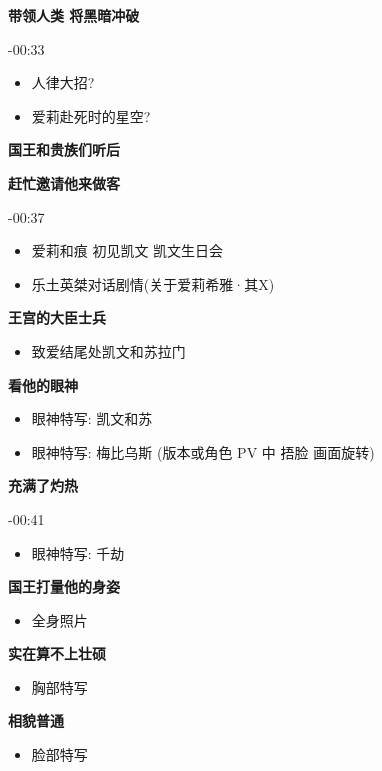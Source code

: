 \documentclass[a4paper]{article}
\begin{document}
\textbf{带领人类 将黑暗冲破}

-00:33

\begin{itemize}
    \item 人律大招?
    \item 爱莉赴死时的星空?
\end{itemize}

\textbf{国王和贵族们听后}

\textbf{赶忙邀请他来做客}

-00:37

\begin{itemize}
    \item 爱莉和痕 初见凯文 凯文生日会
    \item 乐土英桀对话剧情(关于爱莉希雅·其X)
\end{itemize}

\textbf{王宫的大臣士兵}

\begin{itemize}
    \item 致爱结尾处凯文和苏拉门
\end{itemize}

\textbf{看他的眼神}

\begin{itemize}
    \item 眼神特写: 凯文和苏
    \item 眼神特写: 梅比乌斯 (版本或角色 PV 中 捂脸 画面旋转)
\end{itemize}

\textbf{充满了灼热}

-00:41

\begin{itemize}
    \item 眼神特写: 千劫
\end{itemize}

\textbf{国王打量他的身姿}

\begin{itemize}
    \item 全身照片
\end{itemize}

\textbf{实在算不上壮硕}

\begin{itemize}
    \item 胸部特写
\end{itemize}

\textbf{相貌普通}

\begin{itemize}
    \item 脸部特写
\end{itemize}
\end{document}
